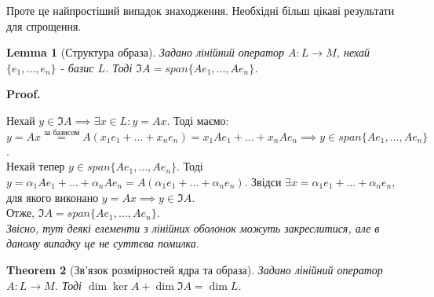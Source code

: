 \documentclass[a4paper, 10pt]{article}
\makeatletter
\theoremstyle{theoremdd}
\newtheorem{theorem}{Theorem}[subsection]
\newtheorem{lemma}[theorem]{Lemma}
\renewenvironment{proof}[1][Proof.\\]{\par
\pushQED{\hfill \qed}%
\normalfont \topsep6\p@\@plus6\p@\relax
\trivlist
\item\relax
{\bfseries
#1\@addpunct{.}}\hspace\labelsep\ignorespaces
}{%
\popQED\endtrivlist\@endpefalse
}
\makeatother
\begin{document}
	Проте це найпростіший випадок знаходження. Необхідні більш цікаві результати для спрощення.
	\begin{lemma}[Структура образа]
	Задано лінійний оператор $A: L \to M$, нехай $\{e_1,\dots, e_n\}$ - базис $L$. Тоді $\Im A = span \{Ae_1,\dots, Ae_n\}$.
	\end{lemma}
	
	\begin{proof}
	Нехай $y \in \Im A \implies \exists x \in L: y = Ax$. Тоді маємо:\\
	$y = Ax \overset{\textrm{за базисом}}{=} A(x_1e_1 + \dots + x_n e_n) = x_1 Ae_1 + \dots + x_n A e_n \implies y \in span\{Ae_1,\dots,Ae_n\}$.\\
	Нехай тепер $y \in span\{Ae_1,\dots,Ae_n\}$. Тоді $y = \alpha_1 Ae_1 + \dots + \alpha_n Ae_n = A(\alpha_1 e_1 + \dots + \alpha_n e_n)$. Звідси $\exists x = \alpha_1 e_1 + \dots + \alpha_n e_n$, для якого виконано $y = Ax \implies y \in \Im A$.\\
	Отже, $\Im A = span \{Ae_1, \dots, Ae_n \}$.\\
	\textit{Звісно, тут деякі елементи з лінійних оболонок можуть закреслитися, але в даному випадку це не суттєва помилка.}
	\end{proof}
	
	\begin{theorem}[Зв'язок розмірностей ядра та образа]
	Задано лінійний оператор $A: L \to M$. Тоді $\dim \ker A + \dim \Im A = \dim L$.
	\end{theorem}
	
\end{document}
